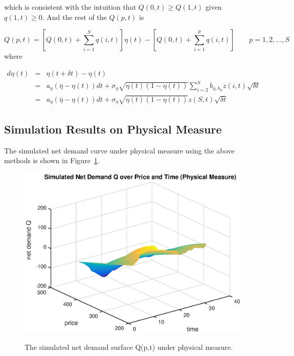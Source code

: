 \documentclass{article}
\begin{document}
which is consistent with the intuition that $Q(0,t) \geq Q(1,t)$ given $q(1,t)\geq 0$. And the rest of the $Q(p,t)$ is

$$
Q(p,t) = [Q(0,t) + \sum_{i=1}^{S}q(i,t)]\eta(t) - [Q(0,t) + \sum_{i=1}^{p}q(i,t)]  \qquad p = 1, 2, \ldots, S
$$
where

\begin{eqnarray*}
d\eta(t) &=& \eta(t+\delta t) - \eta(t) \\
         &=& a_{\eta}(\bar{\eta} - \eta(t)) dt + \sigma_{\eta} \sqrt{\eta(t)(1-\eta(t))}  \sum_{i=2}^{S} b_{\eta,h_p} z(i,t) \sqrt{\delta t } \\
         &=& a_{\eta}(\bar{\eta} - \eta(t)) dt + \sigma_{\eta} \sqrt{\eta(t)(1-\eta(t))} z(S,t) \sqrt{\delta t }
\end{eqnarray*}

\subsection{Simulation Results on Physical Measure}
The simulated net demand curve under physical measure using the above methods is shown in Figure~\ref{fig::AAPL_20110401_simulated_Q_physical_measure}.

\begin{center}
\begin{figure}
  \centering
  \includegraphics[scale = 0.5]{Simulated_Q_Physical_Measure.eps}\\
  \caption{The simulated net demand surface Q(p,t) under physical measure.}\label{fig::AAPL_20110401_simulated_Q_physical_measure}
\end{figure}
\end{center}
\end{document}

